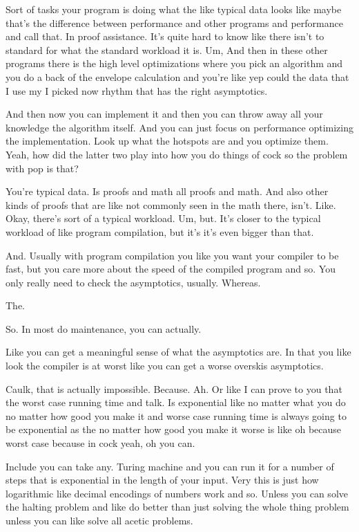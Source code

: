 \begin{subappendices}
    Sort of tasks your program is doing what the like typical data looks like maybe that's the difference between performance and other programs and performance and call that. In proof assistance. It's quite hard to know like there isn't to standard for what the standard workload it is. Um, And then in these other programs there is the high level optimizations where you pick an algorithm and you do a back of the envelope calculation and you're like yep could the data that I use my I picked now rhythm that has the right asymptotics. 
    
    And then now you can implement it and then you can throw away all your knowledge the algorithm itself. And you can just focus on performance optimizing the implementation. Look up what the hotspots are and you optimize them. Yeah, how did the latter two play into how you do things of cock so the problem with pop is that? 
    
    You're typical data. Is proofs and math all proofs and math. And also other kinds of proofs that are like not commonly seen in the math there, isn't. Like. Okay, there's sort of a typical workload. Um, but. It's closer to the typical workload of like program compilation, but it's it's even bigger than that. 
    
    And. Usually with program compilation you like you want your compiler to be fast, but you care more about the speed of the compiled program and so. You only really need to check the asymptotics, usually. Whereas. 
    
    The. 
    
    So. In most do maintenance, you can actually. 
    
    Like you can get a meaningful sense of what the asymptotics are. In that you like look the compiler is at worst like you can get a worse overskis asymptotics. 
    
    Caulk, that is actually impossible. Because. Ah. Or like I can prove to you that the worst case running time and talk. Is exponential like no matter what you do no matter how good you make it and worse case running time is always going to be exponential as the no matter how good you make it worse is like oh because worst case because in cock yeah, oh you can. 
    
    Include you can take any. Turing machine and you can run it for a number of steps that is exponential in the length of your input. Very this is just how logarithmic like decimal encodings of numbers work and so. Unless you can solve the halting problem and like do better than just solving the whole thing problem unless you can like solve all acetic problems. 
    

\end{subappendices}
